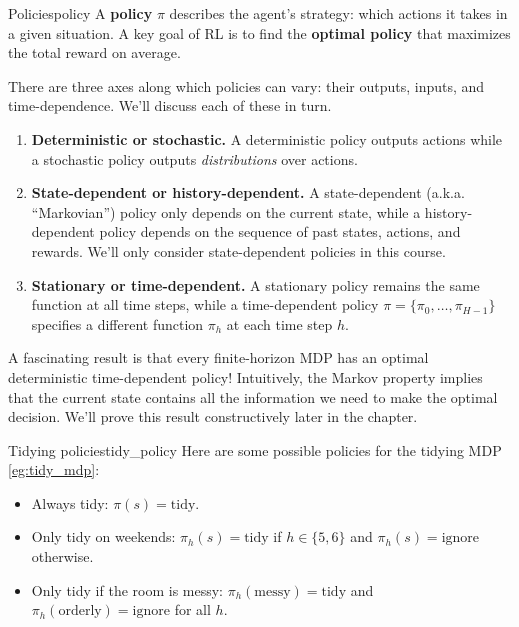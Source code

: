 \documentclass[\main/main]{subfiles}
\begin{document}
\begin{definition}{Policies}{policy}
    A \textbf{policy} $\pi$ describes the agent's strategy: which actions it takes in a given situation. A key goal of RL is to find the \textbf{optimal policy} that maximizes the total reward on average.

    There are three axes along which policies can vary: their outputs, inputs, and time-dependence. We'll discuss each of these in turn.

    \begin{enumerate}
        \item \textbf{Deterministic or stochastic.} A deterministic policy outputs actions while a stochastic policy outputs \emph{distributions} over actions.
        \item \textbf{State-dependent or history-dependent.} A state-dependent (a.k.a. ``Markovian'') policy only depends on the current state, while a history-dependent policy depends on the sequence of past states, actions, and rewards. We'll only consider state-dependent policies in this course.
        \item \textbf{Stationary or time-dependent.} A stationary policy remains the same function at all time steps, while a time-dependent policy $\pi = \{ \pi_0, \dots, \pi_{H-1} \}$ specifies a different function $\pi_h$ at each time step $h$.
    \end{enumerate}
\end{definition}

A fascinating result is that every finite-horizon MDP has an optimal deterministic time-dependent policy! Intuitively, the Markov property implies that the current state contains all the information we need to make the optimal decision. We'll prove this result constructively later in the chapter.


\begin{example}{Tidying policies}{tidy_policy}
    Here are some possible policies for the tidying MDP \eqref{eg:tidy_mdp}:

    \begin{itemize}
        \item Always tidy: $\pi(s) = \text{tidy}$.
        \item Only tidy on weekends: $\pi_h(s) = \text{tidy}$ if $h \in \{ 5, 6 \}$ and $\pi_h(s) = \text{ignore}$ otherwise.
        \item Only tidy if the room is messy: $\pi_h(\text{messy}) = \text{tidy}$ and $\pi_h(\text{orderly}) = \text{ignore}$ for all $h$.
    \end{itemize}
\end{example}
\end{document}
